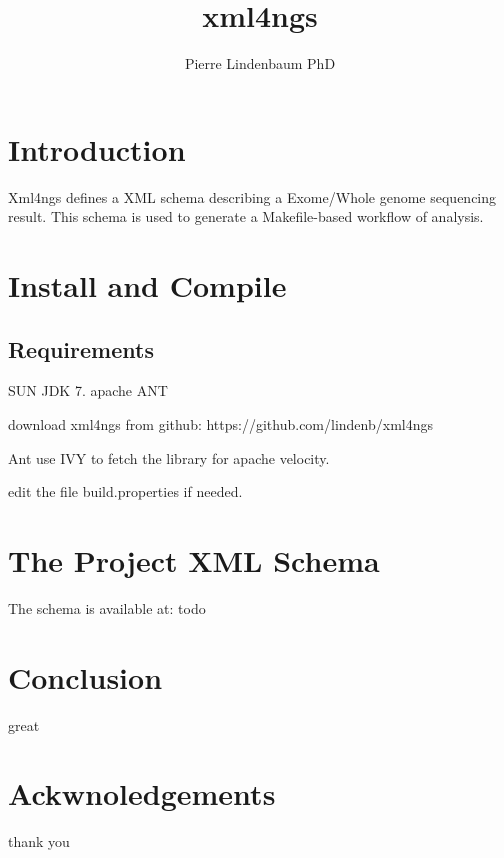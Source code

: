 \documentclass{article}
\author{Pierre Lindenbaum PhD}
\title{xml4ngs}
\date{}
\begin{document}
\maketitle

\section{Introduction}

Xml4ngs defines a XML schema describing a Exome/Whole genome sequencing result. This schema
is used to generate a Makefile-based workflow of analysis.

\section{Install and Compile}

\subsection{Requirements}
SUN JDK 7.
apache ANT

 	
download xml4ngs from github: https://github.com/lindenb/xml4ngs

Ant use IVY to fetch the library for apache velocity.

edit the file build.properties if needed.


 

\section{The Project XML Schema}
The schema is available at: todo

\section{Conclusion}
great
\section{Ackwnoledgements}
thank you
\end{document}
